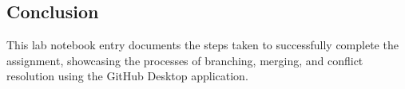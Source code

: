 \subsection{Conclusion}
This lab notebook entry documents the steps taken to successfully complete the assignment, showcasing the processes of branching, merging, and conflict resolution using the GitHub Desktop application.
